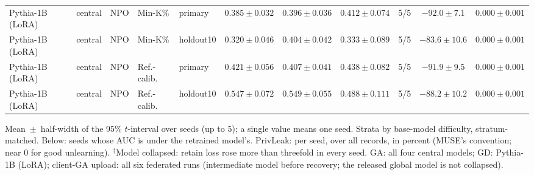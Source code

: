 \begin{table}[t]
\begin{tabular*}{\textwidth}{@{\extracolsep{\fill}}lllllcccccc@{}}
Pythia-1B (LoRA) & central & NPO & Min-K\% & primary & $0.385 \pm 0.032$ & $0.396 \pm 0.036$ & $0.412 \pm 0.074$ & 5/5 & $-92.0 \pm 7.1$ & $0.000 \pm 0.001$ \\
Pythia-1B (LoRA) & central & NPO & Min-K\% & holdout10 & $0.320 \pm 0.046$ & $0.404 \pm 0.042$ & $0.333 \pm 0.089$ & 5/5 & $-83.6 \pm 10.6$ & $0.000 \pm 0.001$ \\
Pythia-1B (LoRA) & central & NPO & Ref.-calib. & primary & $0.421 \pm 0.056$ & $0.407 \pm 0.041$ & $0.438 \pm 0.082$ & 5/5 & $-91.9 \pm 9.5$ & $0.000 \pm 0.001$ \\
Pythia-1B (LoRA) & central & NPO & Ref.-calib. & holdout10 & $0.547 \pm 0.072$ & $0.549 \pm 0.055$ & $0.488 \pm 0.111$ & 5/5 & $-88.2 \pm 10.2$ & $0.000 \pm 0.001$ \\
\bottomrule
\end{tabular*}

\smallskip
{\footnotesize Mean~$\pm$~half-width of the 95\% $t$-interval over seeds (up to 5); a single value means one seed. Strata by base-model difficulty, stratum-matched. Below: seeds whose AUC is under the retrained model's. PrivLeak: per seed, over all records, in percent (MUSE's convention; near 0 for good unlearning). $^{\dagger}$Model collapsed: retain loss rose more than threefold in every seed. GA: all four central models; GD: Pythia-1B (LoRA); client-GA upload: all six federated runs (intermediate model before recovery; the released global model is not collapsed).\par}
\end{table}
